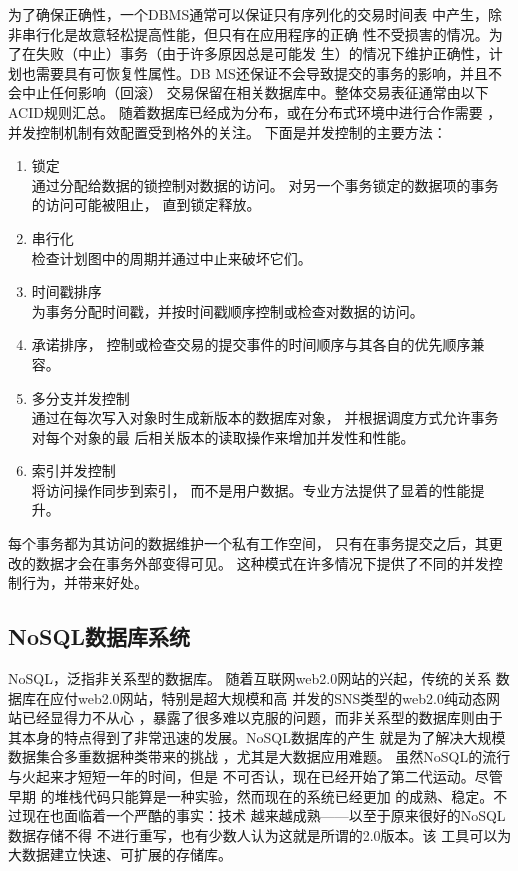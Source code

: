 为了确保正确性，一个DBMS通常可以保证只有序列化的交易时间表
中产生，除非串行化是故意轻松提高性能，但只有在应用程序的正确
性不受损害的情况。为了在失败（中止）事务（由于许多原因总是可能发
生）的情况下维护正确性，计划也需要具有可恢复性属性。DB
MS还保证不会导致提交的事务的影响，并且不会中止任何影响（回滚）
交易保留在相关数据库中。整体交易表征通常由以下ACID规则汇总。
随着数据库已经成为分布，或在分布式环境中进行合作需要
，并发控制机制有效配置受到格外的关注。
下面是并发控制的主要方法：
\begin{enumerate}
	\item 锁定\\
	通过分配给数据的锁控制对数据的访问。
	对另一个事务锁定的数据项的事务
	的访问可能被阻止，
	直到锁定释放。
\item 	串行化\\
 检查计划图中的周期并通过中止来破坏它们。
\item 	时间戳排序\\
   为事务分配时间戳，并按时间戳顺序控制或检查对数据的访问。
\item 	承诺排序， 控制或检查交易的提交事件的时间顺序与其各自的优先顺序兼容。
\item 	多分支并发控制\\
通过在每次写入对象时生成新版本的数据库对象，
	并根据调度方式允许事务对每个对象的最
	后相关版本的读取操作来增加并发性和性能。
\item 	索引并发控制\\
将访问操作同步到索引，
而不是用户数据。专业方法提供了显着的性能提升。
\end{enumerate}
每个事务都为其访问的数据维护一个私有工作空间，
只有在事务提交之后，其更改的数据才会在事务外部变得可见。
这种模式在许多情况下提供了不同的并发控制行为，并带来好处。
\subsection{NoSQL数据库系统}
NoSQL，泛指非关系型的数据库。
随着互联网web2.0网站的兴起，传统的关系
数据库在应付web2.0网站，特别是超大规模和高
并发的SNS类型的web2.0纯动态网站已经显得力不从心
，暴露了很多难以克服的问题，而非关系型的数据库则由于
其本身的特点得到了非常迅速的发展。NoSQL数据库的产生
就是为了解决大规模数据集合多重数据种类带来的挑战
，尤其是大数据应用难题。
虽然NoSQL的流行与火起来才短短一年的时间，但是
不可否认，现在已经开始了第二代运动。尽管早期
的堆栈代码只能算是一种实验，然而现在的系统已经更加
的成熟、稳定。不过现在也面临着一个严酷的事实：技术
越来越成熟——以至于原来很好的NoSQL数据存储不得
不进行重写，也有少数人认为这就是所谓的2.0版本。该
工具可以为大数据建立快速、可扩展的存储库。

